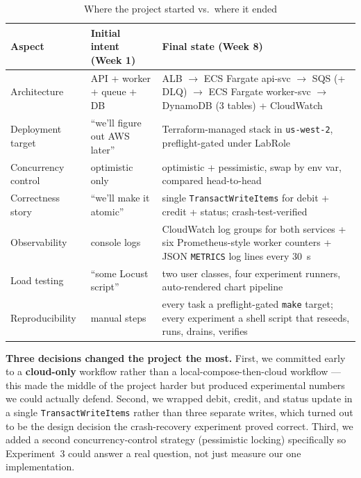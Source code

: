 \documentclass[11pt,a4paper]{article}
\begin{document}
\begin{table}[h]
\centering
\small
\renewcommand{\arraystretch}{1.22}
\caption{Where the project started vs.\ where it ended}
\label{tab:delta}
\begin{tabular}{>{\raggedright\arraybackslash}p{3.8cm} >{\raggedright\arraybackslash}p{5.2cm} >{\raggedright\arraybackslash}p{5.2cm}}
\toprule
\rowcolor{boxblue}
\textbf{Aspect} & \textbf{Initial intent (Week 1)} & \textbf{Final state (Week 8)} \\
\midrule
Architecture & API + worker + queue + DB & ALB $\rightarrow$ ECS Fargate api-svc $\rightarrow$ SQS (+ DLQ) $\rightarrow$ ECS Fargate worker-svc $\rightarrow$ DynamoDB (3 tables) + CloudWatch \\
Deployment target & ``we'll figure out AWS later'' & Terraform-managed stack in \texttt{us-west-2}, preflight-gated under LabRole \\
Concurrency control & optimistic only & optimistic + pessimistic, swap by env var, compared head-to-head \\
Correctness story & ``we'll make it atomic'' & single \texttt{TransactWriteItems} for debit + credit + status; crash-test-verified \\
Observability & console logs & CloudWatch log groups for both services + six Prometheus-style worker counters + JSON \texttt{METRICS} log lines every 30~s \\
Load testing & ``some Locust script'' & two user classes, four experiment runners, auto-rendered chart pipeline \\
Reproducibility & manual steps & every task a preflight-gated \texttt{make} target; every experiment a shell script that reseeds, runs, drains, verifies \\
\bottomrule
\end{tabular}
\end{table}

\begin{highlightbox}
\textbf{Three decisions changed the project the most.} First, we committed early to a \textbf{cloud-only} workflow rather than a local-compose-then-cloud workflow --- this made the middle of the project harder but produced experimental numbers we could actually defend. Second, we wrapped debit, credit, and status update in a single \texttt{TransactWriteItems} rather than three separate writes, which turned out to be the design decision the crash-recovery experiment proved correct. Third, we added a second concurrency-control strategy (pessimistic locking) specifically so Experiment~3 could answer a real question, not just measure our one implementation.
\end{highlightbox}
\end{document}
